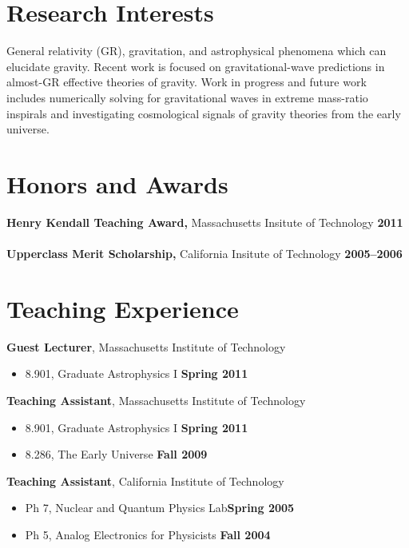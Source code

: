 \documentclass[margin,line]{res}
\begin{document}
\begin{resume}
\section{\sc Research Interests}
General relativity (GR), gravitation, and astrophysical phenomena which can
elucidate gravity. Recent work is focused on gravitational-wave predictions
in almost-GR effective theories of gravity. Work in progress and
future work includes numerically solving for gravitational waves in
extreme mass-ratio inspirals and investigating cosmological
signals of gravity theories from the early universe.

\section{\sc Honors and Awards}
{\bf Henry Kendall Teaching Award,} Massachusetts Insitute of Technology \hfill {\bf 2011}\\
\\
{\bf Upperclass Merit Scholarship,} California Insitute of Technology \hfill {\bf 2005--2006}\\

\section{\sc Teaching Experience}
{\bf Guest Lecturer}, Massachusetts Institute of Technology
\vspace*{.05in}  
\begin{itemize}
\item[ ] 8.901, Graduate Astrophysics I \hfill {\bf Spring 2011}
\end{itemize}
{\bf Teaching Assistant}, Massachusetts Institute of Technology
\vspace*{.05in}
\begin{itemize}
\item[ ] 8.901, Graduate Astrophysics I \hfill {\bf Spring 2011}
\item[ ] 8.286, The Early Universe \hfill {\bf Fall 2009}
\end{itemize}
{\bf Teaching Assistant}, California Institute of Technology
\vspace*{.05in}
\begin{itemize}
\item[ ] Ph 7, Nuclear and Quantum Physics Lab\hfill {\bf Spring 2005}
\item[ ] Ph 5, Analog Electronics for Physicists \hfill {\bf Fall 2004}
\end{itemize}


\end{resume}
\end{document}
